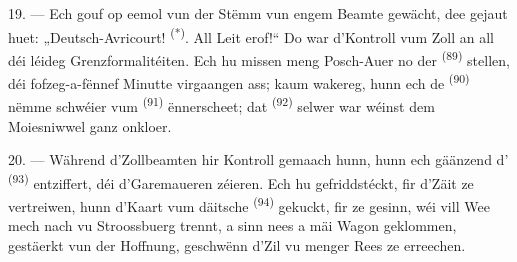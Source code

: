 19. --- Ech gouf op eemol vun der Stëmm vun engem Beamte gewächt, dee gejaut huet:
„Deutsch-Avricourt! \textsuperscript{(*)}. All Leit erof!“ Do war d'Kontroll vum Zoll
an all déi léideg Grenzformalitéiten. Ech hu missen meng Posch-Auer no der
 \textsuperscript{(89)} stellen, déi fofzeg-a-fënnef Minutte
virgaangen ass; kaum wakereg, hunn ech de 
\textsuperscript{(90)} nëmme schwéier vum  \textsuperscript{(91)}
ënnerscheet; dat  \textsuperscript{(92)} selwer war wéinst dem
Moiesniwwel ganz onkloer.

20. --- Während d'Zollbeamten hir Kontroll gemaach hunn, hunn ech gäänzend
d' \textsuperscript{(93)} entziffert, déi d'Garemaueren zéieren. Ech
hu gefriddstéckt, fir d'Zäit ze vertreiwen, hunn d'Kaart vum däitsche
 \textsuperscript{(94)} gekuckt, fir ze gesinn, wéi vill Wee mech nach
vu Stroossbuerg trennt, a sinn nees a mäi Wagon geklommen, gestäerkt vun der
Hoffnung, geschwënn d'Zil vu menger Rees ze erreechen.

\VUsaut{6.0mm}
\VUfilet{22mm}
